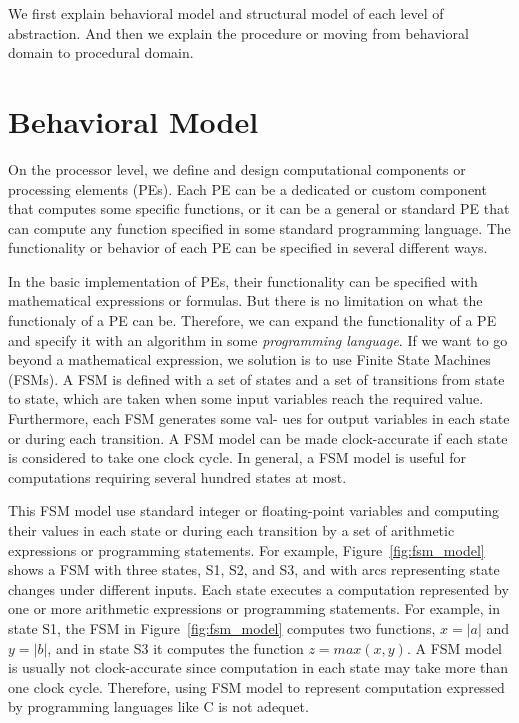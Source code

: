 We first explain behavioral model and structural model of each level of abstraction. And then we explain the procedure or moving from behavioral domain to procedural domain.


\section{Behavioral Model}
\label{sec:processor_level_behavioral_model}

On the processor level, we define and design computational components or processing elements (PEs).
Each PE can be a dedicated or custom component that computes some specific functions, or it can be a general or standard PE that can compute any function specified in some standard programming language.
The functionality or behavior of each PE can be specified in several different ways.

In the basic implementation of PEs, their functionality can be specified with mathematical expressions or formulas.
But there is no limitation on what the functionaly of a PE can be.
Therefore, we can expand the functionality of a PE and specify it with an algorithm in some \textit{programming language}.
If we want to go beyond a mathematical expression, we solution is to use Finite State Machines (FSMs).
A FSM is defined with a set of states and a set of transitions from state to state, which are taken when some input variables reach the required value. Furthermore, each FSM generates some val- ues for output variables in each state or during each transition. A FSM model can be made clock-accurate if each state is considered to take one clock cycle. In general, a FSM model is useful for computations requiring several hundred states at most.

This FSM model use standard integer or floating-point variables and computing their values in each state or during each transition by a set of arithmetic expressions or programming statements.
For example, Figure~\ref{fig:fsm_model} shows a FSM with three states, S1, S2, and S3, and with arcs representing state changes under different inputs.
Each state executes a computation represented by one or more arithmetic expressions or programming statements.
For example, in state S1, the FSM in Figure~\ref{fig:fsm_model} computes two functions, $x = |a|$ and $y = |b|$, and in state S3 it computes the function $z = max (x, y)$.
A FSM model is usually not clock-accurate since computation in each state may take more than one clock cycle.
Therefore, using FSM model to represent computation expressed by programming languages like C is not adequet.

